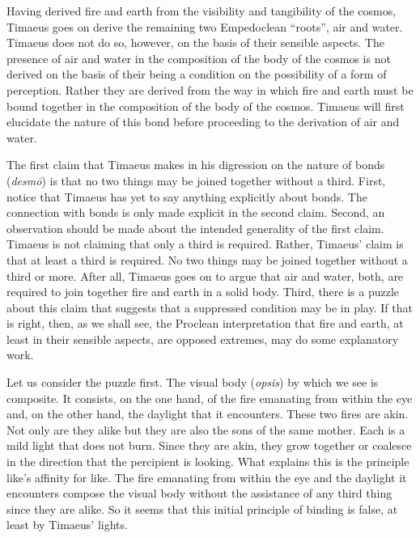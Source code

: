 Having derived fire and earth from the visibility and tangibility of the cosmos, Timaeus goes on derive the remaining two Empedoclean ``roots'', air and water. Timaeus does not do so, however, on the basis of their sensible aspects. The presence of air and water in the composition of the body of the cosmos is not derived on the basis of their being a condition on the possibility of a form of perception. Rather they are derived from the way in which fire and earth must be bound together in the composition of the body of the cosmos. Timaeus will first elucidate the nature of this bond before proceeding to the derivation of air and water.

The first claim that Timaeus makes in his digression on the nature of bonds (\emph{desmō}) is that no two things may be joined together without a third. First, notice that Timaeus has yet to say anything explicitly about bonds. The connection with bonds is only made explicit in the second claim. Second, an observation should be made about the intended generality of the first claim. Timaeus is not claiming that only a third is required. Rather, Timaeus' claim is that at least a third is required. No two things may be joined together without a third or more. After all, Timaeus goes on to argue that air and water, both, are required to join together fire and earth in a solid body. Third, there is a puzzle about this claim that suggests that a suppressed condition may be in play. If that is right, then, as we shall see, the Proclean interpretation that fire and earth, at least in their sensible aspects, are opposed extremes, may do some explanatory work.

Let us consider the puzzle first. The visual body (\emph{opsis}) by which we see is composite. It consists, on the one hand, of the fire emanating from within the eye and, on the other hand, the daylight that it encounters. These two fires are akin. Not only are they alike but they are also the sons of the same mother. Each is a mild light that does not burn. Since they are akin, they grow together or coalesce in the direction that the percipient is looking. What explains this is the principle like's affinity for like. The fire emanating from within the eye and the daylight it encounters compose the visual body without the assistance of any third thing since they are alike. So it seems that this initial principle of binding is false, at least by Timaeus' lights.


